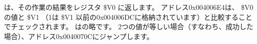 \scanf は、その作業の結果をレジスタ \$V0 に返します。 アドレス0x004006E4は、 
\$V0 の値と \$V1 （1は \$V1 以前の0x004006DCに格納されています）と比較することでチェックされます。 
はの略です。 
2つの値が等しい場合（すなわち、成功した場合）、アドレス0x0040070Cにジャンプします。
